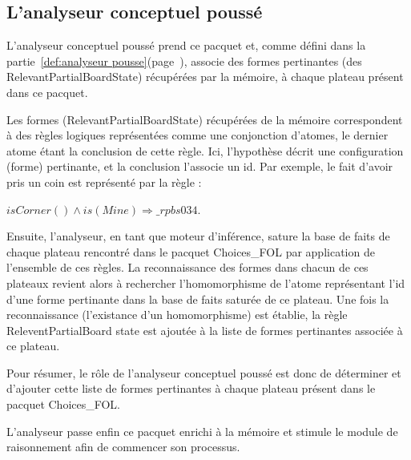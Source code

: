 \subsection{L'analyseur conceptuel poussé}
L'analyseur conceptuel poussé prend ce pacquet et, comme défini dans la partie~\ref{def:analyseur pousse}(page~\pageref{def:analyseur pousse}), associe des formes pertinantes (des RelevantPartialBoardState) récupérées par la mémoire, à chaque plateau présent dans ce pacquet. 

Les formes (RelevantPartialBoardState) récupérées de la mémoire correspondent à des règles logiques représentées comme une conjonction d'atomes, le dernier atome étant la conclusion de cette règle. Ici, l'hypothèse décrit une configuration (forme) pertinante, et la conclusion l'associe un id. Par exemple, le fait d'avoir pris un coin est représenté par la règle :

\textit{$isCorner() \wedge is(Mine) \Longrightarrow \_rpbs034$}. 

Ensuite, l'analyseur, en tant que moteur d'inférence, sature la base de faits de chaque plateau rencontré dans le pacquet Choices\_FOL par application de l'ensemble de ces règles. La reconnaissance des formes dans chacun de ces plateaux revient alors à rechercher l'homomorphisme de l'atome représentant l'id d'une forme pertinante dans la base de faits saturée de ce plateau. Une fois la reconnaissance (l'existance d'un homomorphisme) est établie, la règle ReleventPartialBoard state est ajoutée à la liste de formes pertinantes associée à ce plateau.

Pour résumer, le rôle de l'analyseur conceptuel poussé est donc de déterminer et d'ajouter cette liste de formes pertinantes à chaque plateau présent dans le pacquet Choices\_FOL. 

L'analyseur passe enfin ce pacquet enrichi à la mémoire et stimule le module de raisonnement afin de commencer son processus. 
 
  
  
